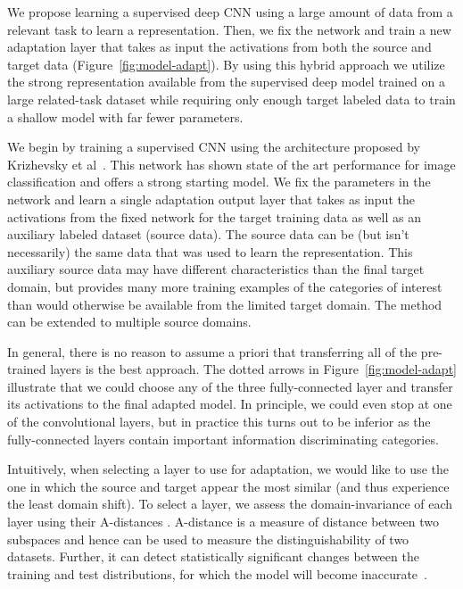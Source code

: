 
We propose learning a supervised deep CNN using a large amount of
data from a relevant task to learn a representation. Then, we fix the network and train a new adaptation layer
that takes as input the activations from both the source and target data (Figure~\ref{fig:model-adapt}). By
using this hybrid approach we utilize the strong representation available from
the supervised deep model trained on a large related-task dataset while requiring only
enough target labeled data to train a shallow model with far fewer parameters.

We begin by training a supervised CNN using the architecture proposed by 
Krizhevsky et al~\cite{supervision}. This network has shown state of the art
performance for image classification and offers a strong starting model.
We fix the 
parameters in the
network and learn a single adaptation output layer that takes as input
the activations from the fixed network for the target training data as well as an auxiliary labeled
dataset (source data). The source data
can be (but isn't necessarily) the same data that was used to learn the representation.
This auxiliary source data may have different characteristics than the final target domain, but
provides many more training examples of the categories of interest than would otherwise be available from the limited target domain. The method can be extended to multiple source domains.

In general, there is no reason to assume a priori that
transferring all of the pre-trained layers is the best approach.
The dotted arrows in Figure~\ref{fig:model-adapt} illustrate that we could choose any of the three fully-connected layer and transfer its activations to the final adapted model. In principle, we could even stop at one of the convolutional layers, but in practice this turns out to be inferior as the fully-connected layers contain important information discriminating categories.


Intuitively, when selecting a layer to use for adaptation, we would like to use
the one in which the source and target appear the most similar (and thus
experience the least domain shift).
To select a layer, we assess the domain-invariance of each layer using their A-distances
\cite{adist}. A-distance is a measure of distance between two subspaces and hence can be used to measure the distinguishability of two datasets. Further, it can detect statistically significant 
changes between the training and test distributions, for which the model will become inaccurate~\cite{adist}.

